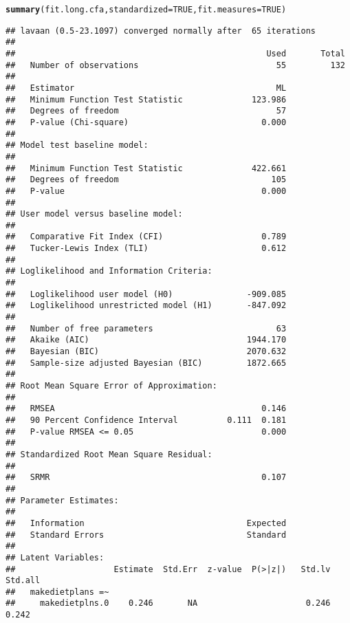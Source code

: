 \documentclass{article}\usepackage[]{graphicx}\usepackage[]{color}
\makeatletter
\newcommand{\hlnum}[1]{\textcolor[rgb]{0.686,0.059,0.569}{#1}}%
\newcommand{\hlstd}[1]{\textcolor[rgb]{0.345,0.345,0.345}{#1}}%
\newcommand{\hlkwc}[1]{\textcolor[rgb]{0.333,0.667,0.333}{#1}}%
\newcommand{\hlkwd}[1]{\textcolor[rgb]{0.737,0.353,0.396}{\textbf{#1}}}%
\newenvironment{kframe}{%
 \def\at@end@of@kframe{}%
 \ifinner\ifhmode%
  \def\at@end@of@kframe{\end{minipage}}%
  \begin{minipage}{\columnwidth}%
 \fi\fi%
 \def\FrameCommand##1{\hskip\@totalleftmargin \hskip-\fboxsep
 \colorbox{shadecolor}{##1}\hskip-\fboxsep
     \hskip-\linewidth \hskip-\@totalleftmargin \hskip\columnwidth}%
 \MakeFramed {\advance\hsize-\width
   \@totalleftmargin\z@ \linewidth\hsize
   \@setminipage}}%
 {\par\unskip\endMakeFramed%
 \at@end@of@kframe}
\newenvironment{knitrout}{}{} %
\makeatother
\begin{document}
\begin{knitrout}
\begin{kframe}
{\ttfamily\noindent{}}\begin{alltt}
\hlkwd{summary}\hlstd{(fit.long.cfa,} \hlkwc{standardized}\hlstd{=}\hlnum{TRUE}\hlstd{,} \hlkwc{fit.measures}\hlstd{=}\hlnum{TRUE}\hlstd{)}
\end{alltt}
\begin{verbatim}
## lavaan (0.5-23.1097) converged normally after  65 iterations
## 
##                                                   Used       Total
##   Number of observations                            55         132
## 
##   Estimator                                         ML
##   Minimum Function Test Statistic              123.986
##   Degrees of freedom                                57
##   P-value (Chi-square)                           0.000
## 
## Model test baseline model:
## 
##   Minimum Function Test Statistic              422.661
##   Degrees of freedom                               105
##   P-value                                        0.000
## 
## User model versus baseline model:
## 
##   Comparative Fit Index (CFI)                    0.789
##   Tucker-Lewis Index (TLI)                       0.612
## 
## Loglikelihood and Information Criteria:
## 
##   Loglikelihood user model (H0)               -909.085
##   Loglikelihood unrestricted model (H1)       -847.092
## 
##   Number of free parameters                         63
##   Akaike (AIC)                                1944.170
##   Bayesian (BIC)                              2070.632
##   Sample-size adjusted Bayesian (BIC)         1872.665
## 
## Root Mean Square Error of Approximation:
## 
##   RMSEA                                          0.146
##   90 Percent Confidence Interval          0.111  0.181
##   P-value RMSEA <= 0.05                          0.000
## 
## Standardized Root Mean Square Residual:
## 
##   SRMR                                           0.107
## 
## Parameter Estimates:
## 
##   Information                                 Expected
##   Standard Errors                             Standard
## 
## Latent Variables:
##                    Estimate  Std.Err  z-value  P(>|z|)   Std.lv  Std.all
##   makedietplans =~                                                      
##     makedietplns.0    0.246       NA                      0.246    0.242

\end{verbatim}
\end{kframe}
\end{knitrout}
\end{document}
